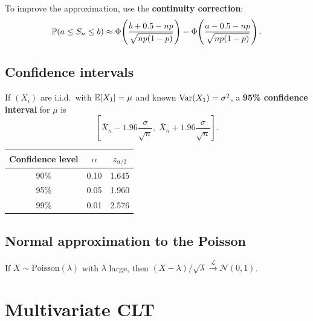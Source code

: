 \begin{warning}[title=\textbf{Continuity correction}]
To improve the approximation, use the \textbf{continuity correction}:
\[
    \mathbb{P}(a \leq S_n \leq b) \approx
    \Phi\!\left(\frac{b+0.5-np}{\sqrt{np(1-p)}}\right)
    - \Phi\!\left(\frac{a-0.5-np}{\sqrt{np(1-p)}}\right).
\]
\end{warning}

\subsection{Confidence intervals}

\begin{corollary}
If $(X_i)$ are i.i.d.\ with $\mathbb{E}[X_1] = \mu$ and known $\mathrm{Var}(X_1) = \sigma^2$,
a \textbf{95\% confidence interval} for $\mu$ is
\[
    \left[\bar{X}_n - 1.96\frac{\sigma}{\sqrt{n}},\;
    \bar{X}_n + 1.96\frac{\sigma}{\sqrt{n}}\right].
\]
\end{corollary}

\begin{keyformulas}[title=\textbf{Common quantiles for confidence intervals}]
\begin{center}
\renewcommand{\arraystretch}{1.3}
\begin{tabular}{ccc}
    \toprule
    Confidence level & $\alpha$ & $z_{\alpha/2}$ \\
    \midrule
    90\% & 0.10 & 1.645 \\
    95\% & 0.05 & 1.960 \\
    99\% & 0.01 & 2.576 \\
    \bottomrule
\end{tabular}
\end{center}
\end{keyformulas}

\subsection{Normal approximation to the Poisson}

\begin{corollary}
If $X \sim \mathrm{Poisson}(\lambda)$ with $\lambda$ large, then
$(X - \lambda)/\sqrt{\lambda} \xrightarrow{\mathcal{L}} \mathcal{N}(0,1)$.
\end{corollary}

\section{Multivariate CLT}

